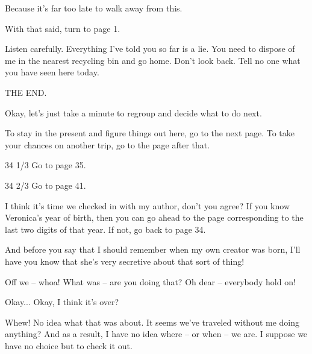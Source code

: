 \documentclass[14pt]{extbook}
\begin{document}
Because it’s far too late to walk away from this.

With that said, turn to page 1.
\vspace*{\fill}
\newpage

\vspace*{\fill}
Listen carefully. Everything I’ve told you so far is a lie. You need to dispose of me in the nearest recycling bin and go home. Don’t look back. Tell no one what you have seen here today.

\begin{center}
  THE END.
\end{center}
\vspace*{\fill}
\newpage

\vspace*{\fill}
\vspace*{\fill}
\newpage

\vspace*{\fill}
\vspace*{\fill}
\newpage

\vspace*{\fill}
\vspace*{\fill}
\newpage

\vspace*{\fill}
Okay, let’s just take a minute to regroup and decide what to do next.

To stay in the present and figure things out here, go to the next page.
To take your chances on another trip, go to the page after that.

34 1/3 Go to page 35.

34 2/3 Go to page 41.
\vspace*{\fill}
\newpage

\vspace*{\fill}
I think it’s time we checked in with my author, don’t you agree? If you know Veronica’s year of birth, then you can go ahead to the page corresponding to the last two digits of that year. If not, go back to page 34.

And before you say that I should remember when my own creator was born, I’ll have you know that she’s very secretive about that sort of thing!
\vspace*{\fill}
\newpage

\vspace*{\fill}
Off we -- whoa! What was -- are you doing that? Oh dear -- everybody hold on!

Okay... Okay, I think it’s over?

Whew! No idea what that was about. It seems we’ve traveled without me doing anything? And as a result, I have no idea where -- or when -- we are. I suppose we have no choice but to check it out.
\end{document}
